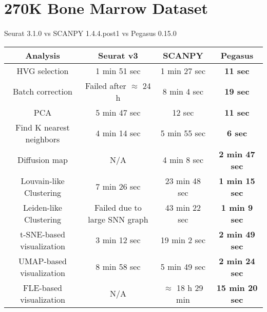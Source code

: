 \documentclass[10pt]{article}
\begin{document}
\section{270K Bone Marrow Dataset}

\paragraph{}
Seurat 3.1.0 \qquad vs \qquad SCANPY 1.4.4.post1 \qquad vs \qquad Pegasus 0.15.0

\begin{table}[H]
	\centering
	\begin{tabular}{|c|c|c|c|}
		\hline
		Analysis & Seurat v3 & SCANPY & Pegasus\\
		\hline \hline
		HVG selection & 1 min 51 sec & 1 min 27 sec & \textbf{11 sec} \\
		\hline
		Batch correction & Failed after $\approx$ 24 h & 8 min 4 sec & \textbf{19 sec} \\
		\hline
		PCA & 5 min 47 sec & 12 sec & \textbf{11 sec} \\
		\hline
		Find K nearest neighbors &  4 min 14 sec &  5 min 55 sec & \textbf{6 sec}\\
		\hline
		Diffusion map & N/A & 4 min 8 sec & \textbf{2 min 47 sec} \\
		\hline
		Louvain-like Clustering & 7 min 26 sec & 23 min 48 sec & \textbf{1 min 15 sec} \\
		\hline 
		Leiden-like Clustering & Failed due to large SNN graph & 43 min 22 sec & \textbf{1 min 9 sec}\\
		\hline
		t-SNE-based visualization & 3 min 12 sec & 19 min 2 sec & \textbf{2 min 49 sec}\\
		\hline
		UMAP-based visualization & 8 min 58 sec & 5 min 49 sec  & \textbf{2 min 24 sec}\\
		\hline
		FLE-based visualization & N/A & $\approx$ 18 h 29 min & \textbf{15 min 20 sec}\\
		\hline
	\end{tabular}
\end{table}
\end{document}

